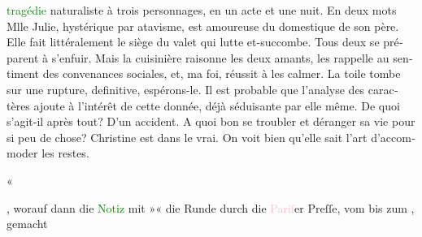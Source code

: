 \documentclass[twoside=false,titlepage=false,open=any, parskip=never, fontsize=12pt, headings=small, chapterprefix=false, appendixprefix=false]{scrbook}
\begin{document}
{{{\begin{otherlanguage}{french}
                           \textcolor{green}{tragédie}
                        naturaliste à trois personnages, en un acte et une nuit. En deux mots Mlle
                        Julie, hystérique par atavisme, est amoureuse du domestique de son père.
                        Elle fait littéralement le siège du valet qui lutte et-succombe. Tous deux
                        se préparent à s’enfuir. Mais la cuisinière raisonne les deux amants, les
                        rappelle au sentiment des convenances sociales, et, ma foi, réussit à les
                        calmer. La toile tombe sur une rupture, definitive, espérons-le. Il est
                        probable que l’analyse des caractères ajoute à l'intérêt de cette donnée,
                        déjà séduisante par elle même. De quoi s’agit-il après tout? D'un accident.
                        A quoi bon se troubler et déranger sa vie pour si peu de chose? Christine
                        est dans le vrai. On voit bien qu'elle sait l'art d'accommoder les
                        restes.\end{otherlanguage}«}}}\label{K_L02669-6h}, worauf dann die \textcolor{green}{Notiz}{} mit »\label{K_L02669-7v}\label{K_L02669-7h}« die Runde durch die \textcolor{pink}{Pariſ}{}\ledrightnote{\textcolor{pink}{Paris}}er Preſſe, vom
                  \label{K_L02669-8v}\label{K_L02669-8h} bis zum \label{K_L02669-666v}\label{K_L02669-666h}, gemacht
\end{document}
